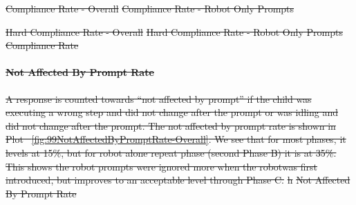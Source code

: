 \documentclass{ut-thesis}
\providecommand{\DIFdeltex}[1]{{\protect\color{red}\sout{#1}}}                      %
\providecommand{\DIFdelFL}[1]{\DIFdel{#1}} %
\providecommand{\DIFdel}[1]{\texorpdfstring{\DIFdeltex{#1}}{}} %
\begin{document}
{%
\DIFdelFL{Compliance Rate - Overall}}
{%
\DIFdelFL{Compliance Rate - Robot Only Prompts}}

{%
\DIFdelFL{Hard Compliance Rate - Overall}}
{%
\DIFdelFL{Hard Compliance Rate - Robot Only Prompts}}
{%
\DIFdelFL{Compliance Rate}}

\paragraph{\DIFdel{Not Affected By Prompt Rate}}
\addtocounter{paragraph}{-1}%
\DIFdel{A response is counted towards ``not affected by prompt'' if the child was executing a wrong step and did not change after the prompt or was idling and did not change after the prompt.
The not affected by prompt rate is shown in Plot \ \ref{fig:99NotAffectedByPromptRate-Overall}.  We see that for most phases, it levels at 15\%, but for robot alone repeat phase (second Phase B) it is at 35\%.  This shows the robot prompts were ignored more when the robotwas first introduced, but improves to an acceptable level through Phase C.
}%
\DIFdelFL{h}%
{%
\DIFdelFL{Not Affected By Prompt Rate}}
\end{document}

